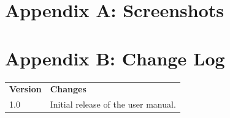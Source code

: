 \documentclass[11pt,a4paper]{article}
\begin{document}
\newpage
\appendix
\section{Appendix A: Screenshots}
\begin{center}
\end{center}

\section{Appendix B: Change Log}
\begin{longtable}{p{3cm} p{10cm}}
\textbf{Version} & \textbf{Changes} \\
1.0 & Initial release of the user manual. \\
\end{longtable}
\end{document}
